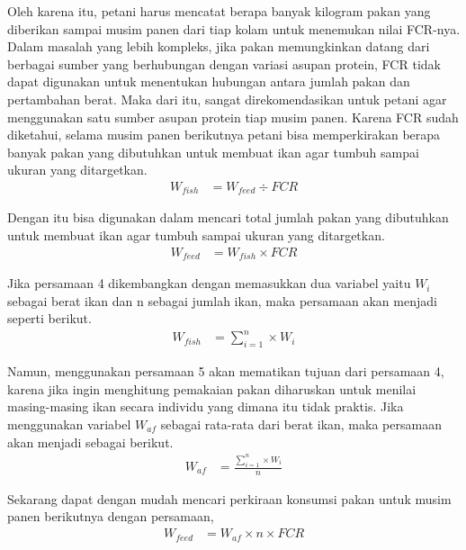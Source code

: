 Oleh karena itu, petani harus mencatat berapa banyak kilogram pakan yang diberikan sampai musim panen dari tiap kolam untuk menemukan nilai FCR-nya. Dalam masalah yang lebih kompleks, jika pakan memungkinkan datang dari berbagai sumber yang berhubungan dengan variasi asupan protein, FCR tidak dapat digunakan untuk menentukan hubungan antara jumlah pakan dan pertambahan berat.  Maka dari itu, sangat direkomendasikan untuk petani agar menggunakan satu sumber asupan protein tiap musim panen. Karena FCR sudah diketahui, selama musim panen berikutnya petani bisa memperkirakan berapa banyak pakan yang dibutuhkan untuk membuat ikan agar tumbuh sampai ukuran yang ditargetkan.
\begin{equation}
    \begin{split}
		W_{fish}
		&= W_{feed} \div FCR
    \end{split}
\end{equation}

Dengan itu bisa digunakan dalam mencari total jumlah pakan yang dibutuhkan untuk membuat ikan agar tumbuh sampai ukuran yang ditargetkan. 
\begin{equation}
    \begin{split}
		W_{feed}
		&= W_{fish} \times FCR
    \end{split}
\end{equation}

Jika persamaan 4 dikembangkan dengan memasukkan dua variabel yaitu $W_i$ sebagai berat ikan dan n sebagai jumlah ikan, maka persamaan akan menjadi seperti berikut.
\begin{equation}
    \begin{split}
		W_{fish}
		&= \sum_{i=1}^n \times W_i
    \end{split}
\end{equation}

Namun, menggunakan persamaan 5 akan mematikan tujuan dari persamaan 4, karena jika ingin menghitung pemakaian pakan diharuskan untuk menilai masing-masing ikan secara individu yang dimana itu tidak praktis. Jika menggunakan variabel $W_{af}$ sebagai rata-rata dari berat ikan, maka persamaan akan menjadi sebagai berikut.
\begin{equation}
    \begin{split}
		W_{af}
		&= \frac{\sum_{i=1}^n \times W_i}{n}
    \end{split}
\end{equation}

Sekarang dapat dengan mudah mencari perkiraan konsumsi pakan untuk musim panen berikutnya dengan persamaan,
\begin{equation}
    \begin{split}
		W_{feed}
		&= W_{af} \times n \times FCR
    \end{split}
\end{equation}


